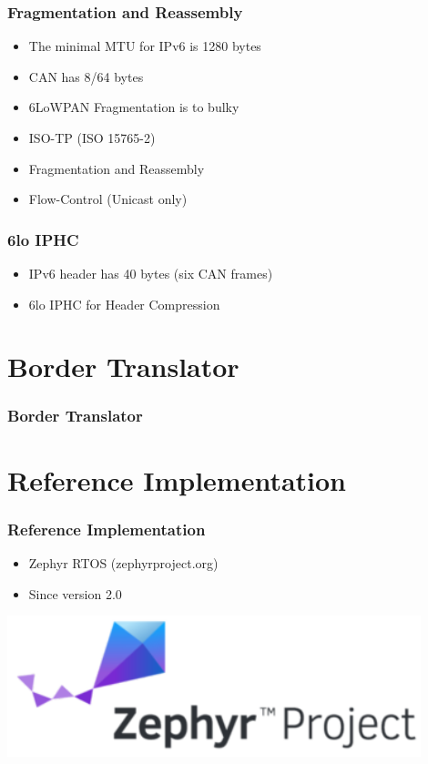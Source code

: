 \documentclass[aspectratio=169]{beamer}
\begin{document}
\begin{frame}
	\frametitle{Fragmentation and Reassembly}
	\begin{itemize}
		\item The minimal MTU for IPv6 is 1280 bytes
		\item CAN has 8/64 bytes
		\item 6LoWPAN Fragmentation is to bulky
		\item ISO-TP (ISO 15765-2)
		\item Fragmentation and Reassembly
		\item Flow-Control (Unicast only)
	\end{itemize}
\end{frame}

\begin{frame}
	\frametitle{6lo IPHC}
	\begin{itemize}
		\item IPv6 header has 40 bytes (six CAN frames)
		\item 6lo IPHC for Header Compression
	\end{itemize}
\end{frame}

\section{Border Translator}
\begin{frame}
	\frametitle{Border Translator}
	
\end{frame}



\section{Reference Implementation}
\begin{frame}
	\frametitle{Reference Implementation}
	\begin{minipage}[t]{0.6\textwidth}
		\begin{itemize}
			\item Zephyr RTOS (zephyrproject.org)
			\item Since version 2.0
		\end{itemize}
	\end{minipage}
	\begin{minipage}[t]{0.39\textwidth}
		\includegraphics[width=0.9\textwidth]{figures/Zephyr-Project.png}
	\end{minipage}
\end{frame}
\end{document}
